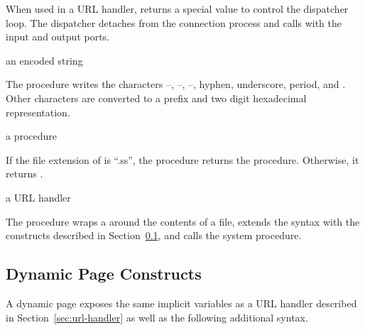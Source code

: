 When used in a URL handler,  returns a
special value to control the dispatcher loop. The dispatcher detaches
from the connection process and calls  with the input and
output ports.

\begin{procedure}
\end{procedure}
\returns{} an encoded string

The  procedure writes the characters
--, --,
--, hyphen, underscore, period, and
\code{\~}. Other characters are converted to a \code{\%} prefix
and two digit hexadecimal representation.

\begin{procedure}
\end{procedure}
\returns{} a procedure \alt{} 

If the file extension of  is ``.ss'', the
 procedure returns the
 procedure. Otherwise, it returns
.

\begin{procedure}
\end{procedure}
\returns{} a URL handler

The  procedure wraps a
 around the contents of a file, extends the
syntax with the constructs described in
Section~\ref{sec:dynamic-page-constructs}, and calls the 
system procedure.

\subsection {Dynamic Page Constructs}\label{sec:dynamic-page-constructs}

A dynamic page exposes the same implicit variables as a URL handler
described in Section~\ref{sec:url-handler} as well as the following
additional syntax.

\begin{syntax}
\end{syntax}\antipar
{}

